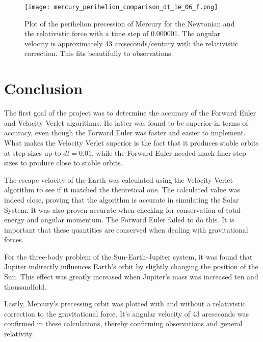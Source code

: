 \documentclass[10pt,a4paper,titlepage]{article}
\begin{document}
\begin{figure}[]
\centering
\centering\texttt{[image: mercury\_perihelion\_comparison\_dt\_1e\_06\_f.png]}
\caption{Plot of the perihelion precession of Mercury for the Newtonian and the relativistic force with a time step of 0.000001. The angular velocity is approximately 43 arcseconds/century with the relativistic correction. This fits beautifully to observations.  \label{fig:mercury}}
\end{figure}

\section{Conclusion}
The first goal of the project was to determine the accuracy of the Forward Euler and Velocity Verlet algorithms. He latter was found to be superior in terms of accuracy, even though the Forward Euler was faster and easier to implement. What makes the Velocity Verlet superior is the fact that it produces stable orbits at step sizes up to $dt = \mathrm{0.01}$, while the Forward Euler needed much finer step sizes to produce close to stable orbits. 

The escape velocity of the Earth was calculated using the Velocity Verlet algorithm to see if it matched the theoretical one. The calculated value was indeed close, proving that the algorithm is accurate in simulating the Solar System. It was also proven accurate when checking for conservation of total energy and angular momentum. The Forward Euler failed to do this. It is important that these quantities are conserved when dealing with gravitational forces. 

For the three-body problem of the Sun-Earth-Jupiter system, it was found that Jupiter indirectly influences Earth's orbit by slightly changing the position of the Sun. This effect was greatly increased when Jupiter's mass was increased ten and thousandfold. 

Lastly, Mercury's precessing orbit was plotted with and without a relativistic correction to the gravitational force. It's angular velocity of 43 arcseconds was confirmed in these calculations, thereby confirming observations and general relativity. 




\end{document}
